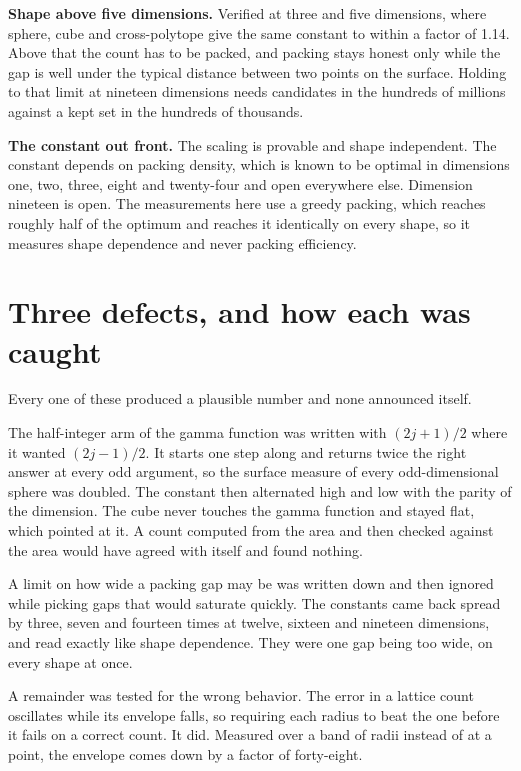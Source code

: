 \textbf{Shape above five dimensions.} Verified at three and five dimensions, where sphere, cube and cross-polytope give the same constant to within a factor of 1.14. Above that the count has to be packed, and packing stays honest only while the gap is well under the typical distance between two points on the surface. Holding to that limit at nineteen dimensions needs candidates in the hundreds of millions against a kept set in the hundreds of thousands.

\textbf{The constant out front.} The scaling is provable and shape independent. The constant depends on packing density, which is known to be optimal in dimensions one, two, three, eight and twenty-four and open everywhere else. Dimension nineteen is open. The measurements here use a greedy packing, which reaches roughly half of the optimum and reaches it identically on every shape, so it measures shape dependence and never packing efficiency.

\section{Three defects, and how each was caught}

Every one of these produced a plausible number and none announced itself.

The half-integer arm of the gamma function was written with $(2j+1)/2$ where it wanted $(2j-1)/2$. It starts one step along and returns twice the right answer at every odd argument, so the surface measure of every odd-dimensional sphere was doubled. The constant then alternated high and low with the parity of the dimension. The cube never touches the gamma function and stayed flat, which pointed at it. A count computed from the area and then checked against the area would have agreed with itself and found nothing.

A limit on how wide a packing gap may be was written down and then ignored while picking gaps that would saturate quickly. The constants came back spread by three, seven and fourteen times at twelve, sixteen and nineteen dimensions, and read exactly like shape dependence. They were one gap being too wide, on every shape at once.

A remainder was tested for the wrong behavior. The error in a lattice count oscillates while its envelope falls, so requiring each radius to beat the one before it fails on a correct count. It did. Measured over a band of radii instead of at a point, the envelope comes down by a factor of forty-eight.

